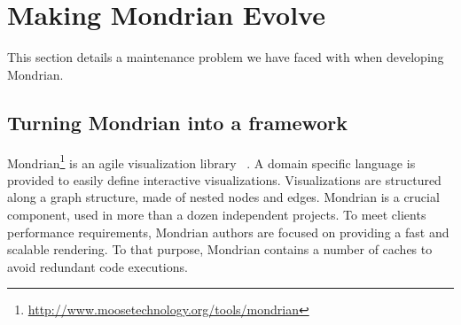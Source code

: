 \documentclass[preprint,10pt]{sigplanconf}
\newcommand{\ab}[1]{\nb{Alexandre}{blue}{#1}}
\newcommand{\seclabel}[1]{\label{sec:#1}}
\begin{document}
%
%
%
%

\section{Making Mondrian Evolve}\seclabel{problem}

This section details a maintenance problem we have faced with when developing Mondrian.

\subsection{Turning Mondrian into a framework}

Mondrian\footnote{\url{http://www.moosetechnology.org/tools/mondrian}} is an agile visualization library ~\cite{Meye06a}. A domain specific language is provided to easily define interactive visualizations.
Visualizations are structured along a graph structure, made of nested nodes and edges. Mondrian is a crucial component, used in more than a dozen independent projects. To meet clients performance requirements, Mondrian authors are focused on providing a fast and scalable rendering. To that purpose, Mondrian contains a number of caches to avoid redundant code executions.
\end{document}
